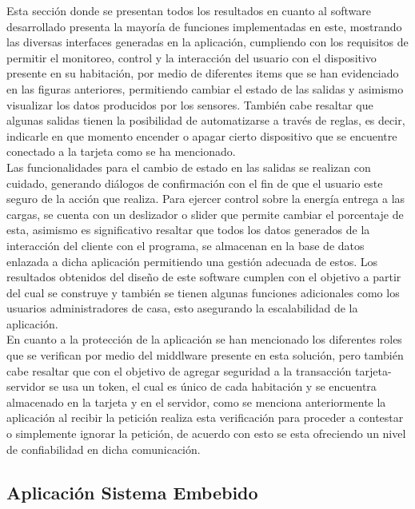Esta sección donde se presentan todos los resultados en cuanto al software desarrollado presenta la mayoría de funciones implementadas en este, mostrando las diversas interfaces generadas en la aplicación, cumpliendo con los requisitos de permitir el monitoreo, control y la interacción del usuario con el dispositivo presente en su habitación, por medio de diferentes items que se han evidenciado en las figuras anteriores, permitiendo cambiar el estado de las salidas y asimismo visualizar los datos producidos por los sensores. También cabe resaltar que algunas salidas tienen la posibilidad de automatizarse a través de reglas, es decir, indicarle en que momento encender o apagar cierto dispositivo que se encuentre conectado a la tarjeta como se ha mencionado.\\

Las funcionalidades para el cambio de estado en las salidas se realizan con cuidado, generando diálogos de confirmación con el fin de que el usuario este seguro de la acción que realiza. Para ejercer control sobre la energía entrega a las cargas, se cuenta con un deslizador o slider que permite cambiar el porcentaje de esta, asimismo es significativo resaltar que todos los datos generados de la interacción del cliente con el programa, se almacenan en la base de datos enlazada a dicha aplicación permitiendo una gestión adecuada de estos. Los resultados obtenidos del diseño de este software cumplen con el objetivo a partir del cual se construye y también se tienen algunas funciones adicionales como los usuarios administradores de casa, esto asegurando la escalabilidad de la aplicación. \\

En cuanto a la protección de la aplicación se han mencionado los diferentes roles que se verifican por medio del middlware presente en esta solución, pero también cabe resaltar que con el objetivo de agregar seguridad a la transacción tarjeta-servidor se usa un token, el cual es único de cada habitación y se encuentra almacenado en la tarjeta y en el servidor, como se menciona anteriormente la aplicación al recibir la petición realiza esta verificación para proceder a contestar o simplemente ignorar la petición, de acuerdo con esto se esta ofreciendo un nivel de confiabilidad en dicha comunicación.\\

\subsection{Aplicación Sistema Embebido} 

